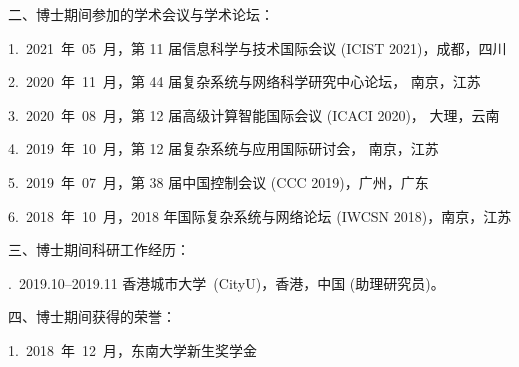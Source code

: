 \vskip 15pt \noindent 二、博士期间参加的学术会议与学术论坛：

\vspace*{3pt} 1.\, 2021~年~05~月，第 11 届信息科学与技术国际会议 (ICIST 2021)，成都，四川

\vspace*{3pt} 2.\, 2020~年~11~月，第 44 届复杂系统与网络科学研究中心论坛， 南京，江苏

\vspace*{3pt} 3.\, 2020~年~08~月，第 12 届高级计算智能国际会议 (ICACI 2020)， 大理，云南

\vspace*{3pt} 4.\, 2019~年~10~月，第 12 届复杂系统与应用国际研讨会， 南京，江苏 

\vspace*{3pt} 5.\, 2019~年~07~月，第 38 届中国控制会议 (CCC 2019)，广州，广东

\vspace*{3pt} 6.\, 2018~年~10~月，2018 年国际复杂系统与网络论坛  (IWCSN 2018)，南京，江苏



\vskip 15pt \noindent 三、博士期间科研工作经历：

.\, 
2019.10--2019.11 香港城市大学~(CityU)，香港，中国 (助理研究员)。

\vskip 15pt \noindent 四、博士期间获得的荣誉：

\vspace*{3pt} 1.\, 2018~年~12~月，东南大学新生奖学金



